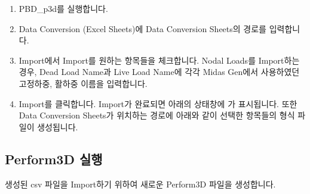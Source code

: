 \documentclass[a4paper,11pt,korean,openany,oneside]{sphinxmanual}
\begin{document}
\begin{sphinxShadowBox}
\begin{enumerate}
%
\item {} 
\sphinxAtStartPar
PBD\_p3d를 실행합니다.

\item {} 
\sphinxAtStartPar
Data Conversion (Excel Sheets)에 Data Conversion Sheets의 경로를 입력합니다.

\item {} 
\sphinxAtStartPar
Import에서 Import를 원하는 항목들을 체크합니다.
Nodal Loads를 Import하는 경우, Dead Load Name과 Live Load Name에 각각 Midas Gen에서 사용하였던 고정하중, 활하중 이름을 입력합니다.

\begin{center}
\noindent{}
\end{center}

\item {} 
\sphinxAtStartPar
Import를 클릭합니다. Import가 완료되면 아래의 상태창에 가 표시됩니다.
또한 Data Conversion Sheets가 위치하는 경로에 아래와 같이 선택한 항목들의  형식 파일이 생성됩니다.

\begin{center}
\noindent{}
\end{center}

\end{enumerate}
\end{sphinxShadowBox}


\subsection{Perform\sphinxhyphen{}3D 실행}
\label{\detokenize{3_import:perform-3d}}
\sphinxAtStartPar
생성된 csv 파일을 Import하기 위하여 새로운 Perform\sphinxhyphen{}3D 파일을 생성합니다.
\end{document}
